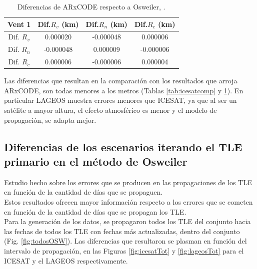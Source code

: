 \begin{table}[!h]
\caption{Diferencias de ARxCODE respecto a Osweiler, \citep{osweiler}.}
 \begin{tabular}{cccc}
  \hline
 Vent 1 & Dif.$R_{v}$ (km) & Dif.$R_{n}$ (km) & Dif.$R_{c}$ (km)\\
 \hline
 Dif. $R_{v}$ & 0.000020 &  -0.000048 &  0.000006 \\
 Dif. $R_{n}$ & -0.000048 &   0.000009 &  -0.000006 \\
 Dif. $R_{c}$ & 0.000006 &  -0.000006 &   0.000004 \\
 \hline
 \end{tabular}
 \label{tab:lageoscomp}
\end{table}

Las diferencias que resultan en la comparaci\'on con los resultados que arroja ARxCODE, son todas menores a los metros (Tablas \ref{tab:icesatcomp} y \ref{tab:lageoscomp}). En particular LAGEOS muestra errores menores que ICESAT, ya que al ser un sat\'elite a mayor altura, el efecto atmosf\'erico es menor y el modelo de propagaci\'on, se adapta mejor.\\

\subsection*{Diferencias de los escenarios iterando el TLE primario en el m\'etodo de Osweiler}
Estudio hecho sobre los errores que se producen en las propagaciones de los TLE en funci\'on de la cantidad de d\'ias que se propaguen.\\

Estos resultados ofrecen mayor informaci\'on respecto a los errores que se cometen en funci\'on de la cantidad de d\'ias que se propagan los TLE.\\

Para la generaci\'on de los datos, se propagaron todos los TLE del conjunto hacia las fechas de todos los TLE con fechas m\'as actualizadas, dentro del conjunto (Fig. \ref{fig:todosOSW}). Las diferencias que resultaron se plasman en funci\'on del intervalo de propagaci\'on, en las Figuras \ref{fig:icesatTot} y \ref{fig:lageosTot} para el ICESAT y el LAGEOS respectivamente. 

